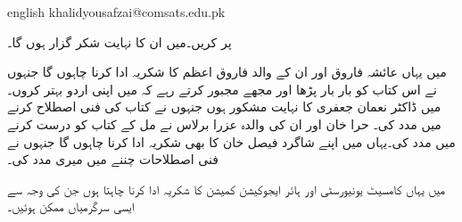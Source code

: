 {
\begin{otherlanguage*}{english}
khalidyousafzai@comsats.edu.pk
\end{otherlanguage*}
}

 پر کریں۔میں ان کا نہایت شکر گزار ہوں گا۔

میں یہاں عائشہ فاروق اور ان کے والد فاروق اعظم کا شکریہ ادا کرنا چاہوں گا جنہوں نے  اس کتاب کو بار بار پڑھا اور مجھے مجبور کرتے رہے کہ میں اپنی اردو بہتر کروں۔میں ڈاکٹر نعمان جعفری کا نہایت مشکور ہوں جنہوں  نے کتاب کی فنی اصطلاح کرنے میں مدد کی۔ حرا خان اور ان کی والدہ عزرا برلاس نے مل کے کتاب کو درست کرنے میں مدد کی۔یہاں میں اپنے شاگرد فیصل خان کا بھی شکریہ ادا کرنا چاہوں گا جنہوں نے فنی اصطلاحات چننے میں میری مدد کی۔

میں یہاں کامسیٹ یونیورسٹی اور ہائر ایجوکیشن کمیشن کا شکریہ ادا کرنا چاہتا ہوں جن کی وجہ سے ایسی سرگرمیاں ممکن ہوئیں۔	
\vspace{5mm}

{}
